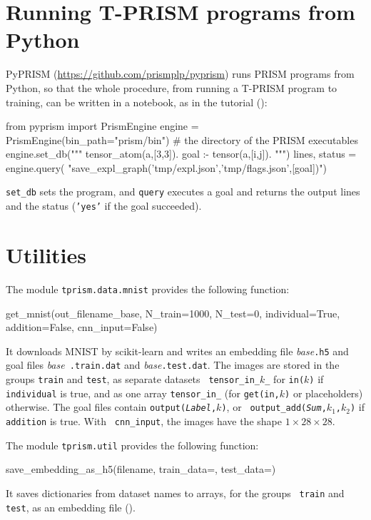 \documentclass[a4paper]{report}
\begin{document}
\section{Running T-PRISM programs from Python}
\label{sec:pyprism}

PyPRISM (\url{https://github.com/prismplp/pyprism}) runs PRISM programs
from Python, so that the whole procedure, from running a T-PRISM program
to training, can be written in a notebook, as in the tutorial
():
\begin{pythoncode}
from pyprism import PrismEngine
engine = PrismEngine(bin_path="prism/bin")   # the directory of the PRISM executables
engine.set_db("""
tensor_atom(a,[3,3]).
goal :- tensor(a,[i,j]).
""")
lines, status = engine.query(
    "save_expl_graph('tmp/expl.json','tmp/flags.json',[goal])")
\end{pythoncode}
{\tt set\_db} sets the program, and {\tt query} executes a goal and
returns the output lines and the status ({\tt 'yes'} if the goal succeeded).

\section{Utilities}
\label{sec:api_util}

The module {\tt tprism.data.mnist} provides the following function:
\begin{pythoncode}
get_mnist(out_filename_base, N_train=1000, N_test=0,
          individual=True, addition=False, cnn_input=False)
\end{pythoncode}
It downloads MNIST \cite{lecun1998mnist} by scikit-learn and writes an
	embedding file {\it base}{\tt .h5} and goal files {\it base}{\tt
		.train.dat} and {\it base}{\tt .test.dat}.  The images are stored in the
	groups {\tt train} and {\tt test}, as separate datasets {\tt
		tensor\_in\_$k$\_} for {\tt in($k$)} if {\tt individual} is true, and as
	one array {\tt tensor\_in\_} (for {\tt get(in,$k$)} or placeholders)
	otherwise.  The goal files contain {\tt output({\it Label},$k$)}, or {\tt
		output\_add({\it Sum},$k_1$,$k_2$)} if {\tt addition} is true.  With {\tt
		cnn\_input}, the images have the shape $1\times 28\times 28$.

The module {\tt tprism.util} provides the following function:
\begin{pythoncode}
save_embedding_as_h5(filename, train_data={}, test_data={})
\end{pythoncode}
It saves dictionaries from dataset names to arrays, for the groups {\tt
	train} and {\tt test}, as an embedding file ().
\end{document}
